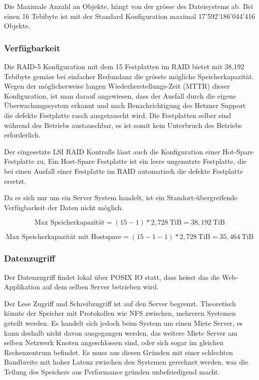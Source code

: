 Die Maximale Anzahl an Objekte, hängt von der grösse des Dateisystems ab. Bei einen 16 Tebibyte ist mit der Standard Konfiguration maximal 17'592'186'044'416 Objekte. 

\subsubsection*{Verfügbarkeit}
Die RAID-5 Konfiguration mit dem 15 Festplatten im RAID bietet mit 38,192 Tebibyte gemäss  bei einfacher Redundanz die grösste mögliche Speicherkapazität. Wegen der möglicherweise langen Wiederherstellungs-Zeit (MTTR) dieser Konfiguration, ist man darauf angewiesen, dass der Ausfall durch die eigene Überwachungssystem erkannt und nach Benachrichtigung des Hetzner Support die defekte Festplatte rasch ausgetauscht wird. Die Festplatten selber sind während des Betriebs austauschbar, es ist somit kein Unterbruch des Betriebs erforderlich.

Der eingesetzte LSI RAID Kontrolle lässt auch die Konfiguration einer Hot-Spare Festplatte zu. Ein Host-Spare Festplatte ist ein leere ungenutzte Festplatte, die bei einen Ausfall einer Festplatte im RAID automatisch die defekte Festplatte ersetzt. 

Da es sich nur um ein Server System handelt, ist ein Standort-übergreifende Verfügbarkeit der Daten nicht möglich.


\begin{equation}
\mbox{Max Speicherkapazität} = (15 -1)* 2,728 \mathrm{\ TiB}= 38,192 \mathrm{\ TiB}
\label{eqn:MaxSpeicherkapazitätHeztner}
\end{equation}

\begin{equation}
\mbox{Max Speicherkapazität mit Hostspare} = (15 -1-1)* 2,728 \mathrm{\ TiB}= 35,464 \mathrm{\ TiB}
\label{eqn:MaxSpeicherkapazitätHeztnerHotspare}
\end{equation}

\subsubsection*{Datenzugriff}
Der Datenzugriff findet lokal über POSIX IO statt, dass heisst das die Web-Applikation auf dem selben Server betrieben wird. 

Der Lese Zugriff und Schreibzugriff ist auf den Server begrenzt. Theoretisch könnte der Speicher mit Protokollen wie NFS zwischen, mehreren Systemen geteilt werden. Es handelt sich jedoch beim System um einen Miete Server, es kann deshalb nicht davon ausgegangen werden, das weitere Miete Server am selben Netzwerk Knoten angeschlossen sind, oder sich sogar im gleichen Rechenzentrum befindet. Es muss aus diesen Gründen mit einer schlechten Bandbreite mit hoher Latenz zwischen den Systemen gerechnet werden, was die Teilung des Speichers aus Performance gründen unbefriedigend macht.

